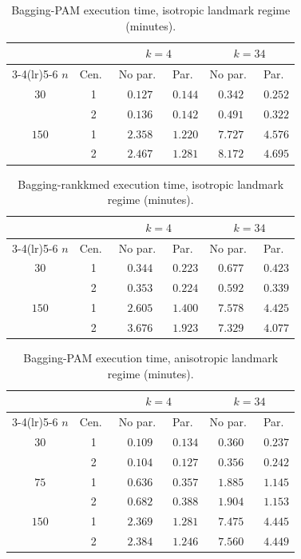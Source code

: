 \documentclass[11pt,a4paper]{article}
\begin{document}
\begin{table}[h]
\centering
\caption{Bagging-PAM execution time, isotropic landmark regime
  (minutes).}
\label{tab:time-pam-iso}
\small
\begin{tabular}{cc cc cc}
\toprule
& & \multicolumn{2}{c}{$k=4$} & \multicolumn{2}{c}{$k=34$} \\
\cmidrule(lr){3-4}\cmidrule(lr){5-6}
$n$ & Cen.\ & No par.\ & Par.\ & No par.\ & Par.\ \\
\midrule
$30$  & 1 & $0.127$ & $0.144$ & $0.342$ & $0.252$ \\
      & 2 & $0.136$ & $0.142$ & $0.491$ & $0.322$ \\
$150$ & 1 & $2.358$ & $1.220$ & $7.727$ & $4.576$ \\
      & 2 & $2.467$ & $1.281$ & $8.172$ & $4.695$ \\
\bottomrule
\end{tabular}
\end{table}

\begin{table}[h]
\centering
\caption{Bagging-rankkmed execution time, isotropic landmark regime
  (minutes).}
\label{tab:time-rkm-iso}
\small
\begin{tabular}{cc cc cc}
\toprule
& & \multicolumn{2}{c}{$k=4$} & \multicolumn{2}{c}{$k=34$} \\
\cmidrule(lr){3-4}\cmidrule(lr){5-6}
$n$ & Cen.\ & No par.\ & Par.\ & No par.\ & Par.\ \\
\midrule
$30$  & 1 & $0.344$ & $0.223$ & $0.677$ & $0.423$ \\
      & 2 & $0.353$ & $0.224$ & $0.592$ & $0.339$ \\
$150$ & 1 & $2.605$ & $1.400$ & $7.578$ & $4.425$ \\
      & 2 & $3.676$ & $1.923$ & $7.329$ & $4.077$ \\
\bottomrule
\end{tabular}
\end{table}

\begin{table}[h]
\centering
\caption{Bagging-PAM execution time, anisotropic landmark regime
  (minutes).}
\label{tab:time-pam-aniso}
\small
\begin{tabular}{cc cc cc}
\toprule
& & \multicolumn{2}{c}{$k=4$} & \multicolumn{2}{c}{$k=34$} \\
\cmidrule(lr){3-4}\cmidrule(lr){5-6}
$n$ & Cen.\ & No par.\ & Par.\ & No par.\ & Par.\ \\
\midrule
$30$  & 1 & $0.109$ & $0.134$ & $0.360$ & $0.237$ \\
      & 2 & $0.104$ & $0.127$ & $0.356$ & $0.242$ \\
$75$  & 1 & $0.636$ & $0.357$ & $1.885$ & $1.145$ \\
      & 2 & $0.682$ & $0.388$ & $1.904$ & $1.153$ \\
$150$ & 1 & $2.369$ & $1.281$ & $7.475$ & $4.445$ \\
      & 2 & $2.384$ & $1.246$ & $7.560$ & $4.449$ \\
\bottomrule
\end{tabular}
\end{table}
\end{document}
